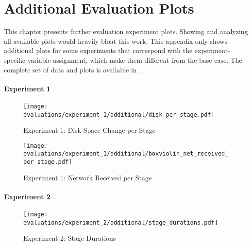 \chapter{Additional Evaluation Plots}\label{appendix:evaluation_plots}

This chapter presents further evaluation experiment plots.
Showing and analyzing all available plots would heavily bloat this work.
This appendix only shows additional plots for some experiments that correspond with the experiment-specific variable assignment, which make them different from the base case.
The complete set of data and plots is available in \cite{cli_code}.

\subsubsection{Experiment 1}

\begin{figure}[H]
    \begin{adjustwidth}{-0.2\paperwidth}{-0.2\paperwidth}
        \centering
        \texttt{[image: evaluations/experiment\_1/additional/disk\_per\_stage.pdf]}
        \caption{Experiment 1: Disk Space Change per Stage}
        \label{fig:eval_1_disk_space_per_stage}
    \end{adjustwidth}
\end{figure}

\begin{figure}[H]
    \begin{adjustwidth}{-0.2\paperwidth}{-0.2\paperwidth}
        \centering
        \texttt{[image: evaluations/experiment\_1/additional/boxviolin\_net\_received\_per\_stage.pdf]}
        \caption{Experiment 1: Network Received per Stage}
        \label{fig:eval_1_net_received}
    \end{adjustwidth}
\end{figure}

\subsubsection{Experiment 2}

\begin{figure}[H]
    \begin{adjustwidth}{-0.2\paperwidth}{-0.2\paperwidth}
        \centering
        \texttt{[image: evaluations/experiment\_2/additional/stage\_durations.pdf]}
        \caption{Experiment 2: Stage Durations}
        \label{fig:eval_2_stage_durations}
    \end{adjustwidth}
\end{figure}


